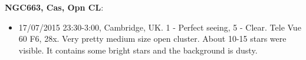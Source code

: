 {\bf NGC663, Cas, Opn CL}:
\begin{itemize}
\item 17/07/2015 23:30-3:00, Cambridge, UK. 1 - Perfect seeing, 5 - Clear. Tele Vue 60 F6, 28x. Very pretty medium size open cluster. About 10-15 stars were visible. It contains some bright stars and the background is dusty.
\end{itemize}
